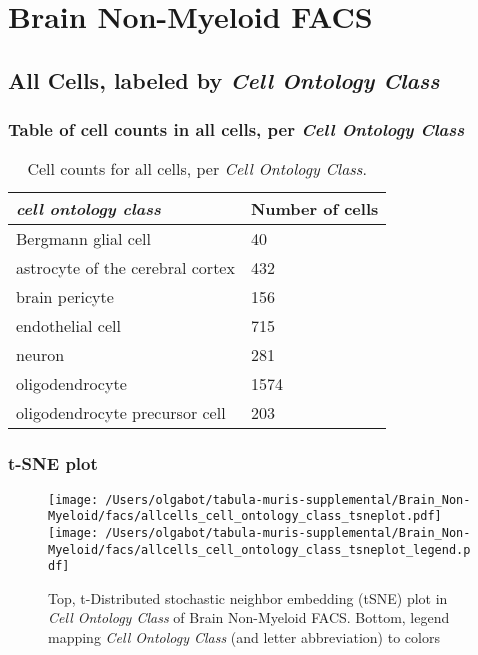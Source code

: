 \clearpage
\section{Brain Non-Myeloid FACS}

\subsection{All Cells, labeled by \emph{Cell Ontology Class}}
\subsubsection{Table of cell counts in all cells, per \emph{Cell Ontology Class}}\begin{table}[h]
\centering
\label{my-label}
\begin{tabular}{@{}ll@{}}
\toprule

\emph{cell ontology class}& Number of cells \\ \midrule
Bergmann glial cell & 40 \\

astrocyte of the cerebral cortex & 432 \\

brain pericyte & 156 \\

endothelial cell & 715 \\

neuron & 281 \\

oligodendrocyte & 1574 \\

oligodendrocyte precursor cell & 203 \\
\bottomrule
\end{tabular}
\caption{Cell counts for all cells, per \emph{Cell Ontology Class}.}
\end{table}

\clearpage
\subsubsection{t-SNE plot}
\begin{figure}[h]
\centering
\texttt{[image: /Users/olgabot/tabula-muris-supplemental/Brain\_Non-Myeloid/facs/allcells\_cell\_ontology\_class\_tsneplot.pdf]}
\texttt{[image: /Users/olgabot/tabula-muris-supplemental/Brain\_Non-Myeloid/facs/allcells\_cell\_ontology\_class\_tsneplot\_legend.pdf]}
\caption{Top, t-Distributed stochastic neighbor embedding (tSNE) plot  in \emph{Cell Ontology Class} of Brain Non-Myeloid FACS. Bottom, legend mapping \emph{Cell Ontology Class} (and letter abbreviation) to colors}
\end{figure}


